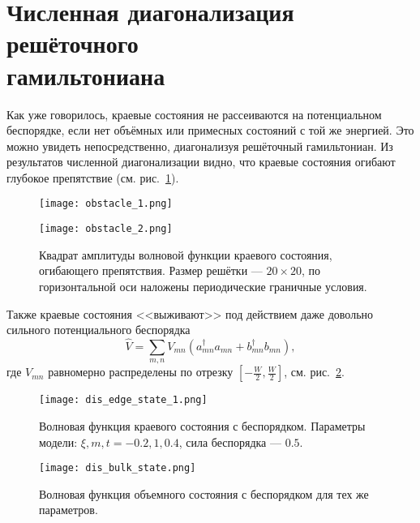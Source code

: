 \section{Численная диагонализация решёточного\\ гамильтониана}
Как уже говорилось, краевые состояния не рассеиваются на потенциальном беспорядке, 
если нет объёмных или примесных состояний с той же энергией. 
Это можно увидеть непосредственно, 
диагонализуя решёточный гамильтониан. Из результатов численной диагонализации видно, что
краевые состояния огибают глубокое препятствие (см. рис.~\ref{fig:obstacle}).
\begin{figure}[h]
    \centering
    \begin{minipage}[t]{0.4\linewidth}
        \texttt{[image: obstacle\_1.png]}
    \end{minipage}
    \hfill
    \begin{minipage}[t]{0.4\linewidth}
        \texttt{[image: obstacle\_2.png]}
    \end{minipage}
    \caption{
        Квадрат амплитуды волновой функции краевого состояния, огибающего препятствия. 
        Размер решётки --- $20\times20$, по горизонтальной оси наложены периодические
        граничные условия.
    }
    \label{fig:obstacle}
\end{figure}

Также краевые состояния <<выживают>> под действием даже довольно сильного потенциального
беспорядка
\begin{equation}
    \hat{V} = \sum_{m,n} V_{mn} (a_{mn}^\dagger a_{mn} + b_{mn}^\dagger b_{mn}),
\end{equation}
где $V_{mn}$ равномерно распределены по отрезку $[-\frac{W}{2}, \frac{W}{2}]$, см.
рис.~\ref{fig:disordered_stripe}.

\begin{figure}[h]
    \centering
    \begin{minipage}[h]{0.4\linewidth}
        \texttt{[image: dis\_edge\_state\_1.png]}
        \caption{
            Волновая функция краевого состояния с беспорядком.
            Параметры модели: $\xi, m, t = -0.2, 1, 0.4$, сила беспорядка --- $0.5$.
            }
    \end{minipage}
    \hfill
    \begin{minipage}[h]{0.4\linewidth}
        \texttt{[image: dis\_bulk\_state.png]}
        \caption{
            Волновая функция объемного состояния с беспорядком для тех же параметров.
            }
    \end{minipage}
    \label{fig:disordered_stripe}
\end{figure}

